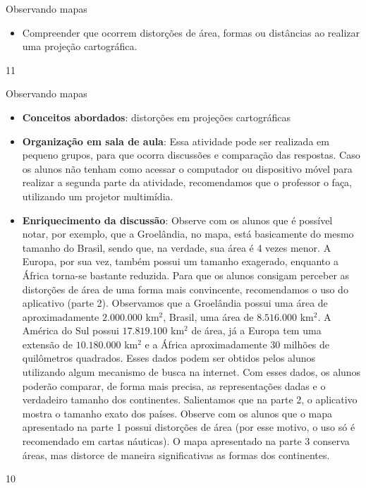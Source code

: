 \begin{objectives}{Observando mapas}
{
  \begin{itemize}
  \item Compreender que ocorrem distorções de área, formas ou distâncias ao realizar uma projeção cartográfica.
 
  \end{itemize}
}{1}{1}
\end{objectives}
\clearmargin
\begin{sugestions}{Observando mapas}
{
  \begin{itemize}
  \item  \textbf{Conceitos abordados}: distorções em projeções cartográficas
  \item \textbf{Organização em sala de aula}: Essa atividade pode ser realizada em pequeno grupos, para que ocorra discussões e comparação das respostas. Caso os alunos não tenham como acessar o computador ou dispositivo móvel para realizar a segunda parte da atividade, recomendamos que o professor o faça, utilizando um projetor multimídia.
  \item \textbf{Enriquecimento da discussão}:    Observe com os alunos que é possível notar, por exemplo, que a Groelândia, no mapa, está basicamente do mesmo tamanho do Brasil, sendo que, na verdade, sua área é 4 vezes menor. A Europa, por sua vez, também possui um tamanho exagerado, enquanto a África torna-se bastante reduzida. Para que os alunos consigam perceber as distorções de área de uma forma mais convincente, recomendamos o uso do aplicativo (parte 2). Observamos que a Groelândia possui uma área de aproximadamente $2.000.000$ km$^{2}$, Brasil, uma área de $8.516.000$ km$^2$. A América do Sul possui $17.819.100$ km$^2$ de área, já a Europa tem uma extensão de $10.180.000$ km$^2$ e a África aproximadamente 30 milhões de quilômetros quadrados. Esses dados podem ser obtidos pelos alunos utilizando algum mecanismo de busca na internet. Com esses dados, os alunos poderão comparar, de forma mais precisa, as representações dadas e o verdadeiro tamanho dos continentes. Salientamos que na parte 2, o aplicativo mostra o tamanho exato dos países. Observe com os alunos que o mapa apresentado na parte 1 possui distorções de área (por esse motivo, o uso só é recomendado em cartas náuticas). O mapa apresentado na parte 3 conserva áreas, mas distorce de maneira significativas as formas dos continentes.

  \end{itemize}
}{1}{0}
\end{sugestions}

